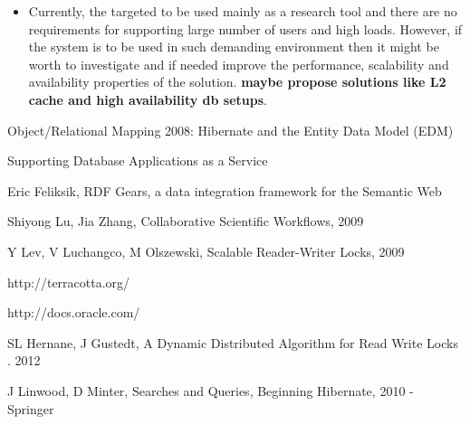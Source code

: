 \begin{itemize}
\item Currently, the targeted to be used mainly as a research tool and there are no requirements for supporting large number of users and high loads. However, if the system is to be used in such demanding environment then it might be worth to investigate and if needed improve the performance, scalability and availability properties of the solution. \textbf{maybe propose solutions like L2 cache and high availability db setups}. 

\end{itemize}

\begin{thebibliography}{99}

 Object/Relational Mapping 2008: Hibernate and the Entity Data Model (EDM)

 Supporting Database Applications as a Service

 Eric Feliksik, RDF Gears, a data integration framework for the Semantic Web

 Shiyong Lu, Jia Zhang, Collaborative Scientific Workflows, 2009

 Y Lev, V Luchangco, M Olszewski, Scalable Reader-Writer Locks, 2009

 http://terracotta.org/

 http://docs.oracle.com/

 SL Hernane, J Gustedt, A Dynamic Distributed Algorithm for Read Write Locks . 2012

 J Linwood, D Minter, Searches and Queries, Beginning Hibernate, 2010 - Springer

\end{thebibliography}
